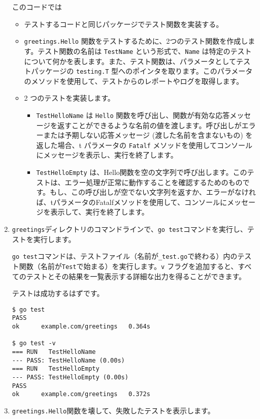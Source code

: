 \begin{enumerate}
このコードでは
\begin{itemize}
\item テストするコードと同じパッケージでテスト関数を実装する。
\item \texttt{greetings.Hello} 関数をテストするために、2つのテスト関数を作成します。テスト関数の名前は \texttt{TestName} という形式で、\texttt{Name} は特定のテストについて何かを表します。また、テスト関数は、パラメータとしてテストパッケージの \texttt{testing.T} 型へのポインタを取ります。このパラメータのメソッドを使用して、テストからのレポートやログを取得します。
\item 2 つのテストを実装します。
\begin{itemize}
\item \texttt{TestHelloName} は \texttt{Hello} 関数を呼び出し、関数が有効な応答メッセージを返すことができるような名前の値を渡します。呼び出しがエラーまたは予期しない応答メッセージ (渡した名前を含まないもの) を返した場合、t パラメータの \texttt{Fatalf} メソッドを使用してコンソールにメッセージを表示し、実行を終了します。
\item \texttt{TestHelloEmpty} は、Hello関数を空の文字列で呼び出します。このテストは、エラー処理が正常に動作することを確認するためのものです。もし、この呼び出しが空でない文字列を返すか、エラーがなければ、tパラメータのFatalfメソッドを使用して、コンソールにメッセージを表示して、実行を終了します。
\end{itemize}
\end{itemize}

\item \texttt{greetings}ディレクトリのコマンドラインで、\texttt{go test}コマンドを実行し、テストを実行します。

\texttt{go test}コマンドは、テストファイル（名前が\texttt{\_test.go}で終わる）内のテスト関数（名前が\texttt{Test}で始まる）を実行します。\texttt{v} フラグを追加すると、すべてのテストとその結果を一覧表示する詳細な出力を得ることができます。

テストは成功するはずです。

\begin{lstlisting}[numbers=none]
$ go test
PASS
ok      example.com/greetings   0.364s

$ go test -v
=== RUN   TestHelloName
--- PASS: TestHelloName (0.00s)
=== RUN   TestHelloEmpty
--- PASS: TestHelloEmpty (0.00s)
PASS
ok      example.com/greetings   0.372s
\end{lstlisting}

\item \texttt{greetings.Hello}関数を壊して、失敗したテストを表示します。


\end{enumerate}
